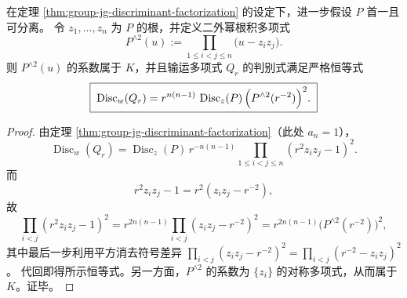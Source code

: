 \begin{corollary}[判别式的外幂平方因子分解]\label{cor:group-jg-discriminant-wedge2-square}
在定理 \ref{thm:group-jg-discriminant-factorization} 的设定下，进一步假设 \(P\) 首一且可分离。
令 \(z_1,\dots,z_n\) 为 \(P\) 的根，并定义二外幂根积多项式
\[
P^{\wedge 2}(u):=\prod_{1\le i<j\le n}\bigl(u-z_i z_j\bigr).
\]
则 \(P^{\wedge 2}(u)\) 的系数属于 \(K\)，并且输运多项式 \(Q_r\) 的判别式满足严格恒等式
\[
\boxed{\;
\operatorname{Disc}_{w}(Q_r)
=r^{n(n-1)}\,\operatorname{Disc}_{z}(P)\,\Bigl(P^{\wedge 2}(r^{-2})\Bigr)^2.
\;}
\]
\end{corollary}

\begin{proof}
由定理 \ref{thm:group-jg-discriminant-factorization}（此处 \(a_n=1\)），
\[
\operatorname{Disc}_{w}(Q_r)
=\operatorname{Disc}_{z}(P)\,
r^{-n(n-1)}\prod_{1\le i<j\le n}(r^2 z_i z_j-1)^2.
\]
而
\[
r^2 z_i z_j-1=r^2(z_i z_j-r^{-2}),
\]
故
\[
\prod_{i<j}(r^2 z_i z_j-1)^2
=r^{2n(n-1)}\prod_{i<j}(z_i z_j-r^{-2})^2
=r^{2n(n-1)}\bigl(P^{\wedge 2}(r^{-2})\bigr)^2,
\]
其中最后一步利用平方消去符号差异
\(
\prod_{i<j}(z_i z_j-r^{-2})^2=\prod_{i<j}(r^{-2}-z_i z_j)^2
\)。
代回即得所示恒等式。另一方面，\(P^{\wedge 2}\) 的系数为 \(\{z_i\}\) 的对称多项式，从而属于 \(K\)。证毕。
\end{proof}

